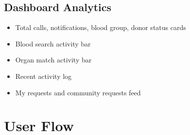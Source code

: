 \documentclass[12pt,a4paper]{article}
\begin{document}
\subsection{Dashboard Analytics}

\begin{itemize}[leftmargin=*]
    \item Total calls, notifications, blood group, donor status cards
    \item Blood search activity bar
    \item Organ match activity bar
    \item Recent activity log
    \item My requests and community requests feed
\end{itemize}

\section{User Flow}
\end{document}

